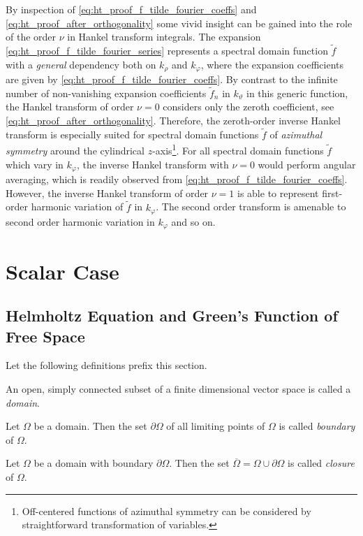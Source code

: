 By inspection of \eqref{eq:ht_proof_f_tilde_fourier_coeffs} and
\eqref{eq:ht_proof_after_orthogonality} some vivid insight can be gained
into the role of the order $\nu$ in Hankel transform integrals. 
The expansion \eqref{eq:ht_proof_f_tilde_fourier_series} represents a
spectral domain function $\tilde{f}$ with a \emph{general} dependency both on
$k_\rho$ and $k_\varphi$, where the expansion coefficients are given by
\eqref{eq:ht_proof_f_tilde_fourier_coeffs}.
By contrast to the infinite number of non-vanishing expansion coefficients
$\tilde{f}_n$ in $k_\vartheta$ in this generic function, the Hankel transform
of order $\nu = 0$ considers only the zeroth coefficient,
see \eqref{eq:ht_proof_after_orthogonality}.
Therefore, the zeroth-order inverse Hankel transform is especially suited for
spectral domain functions $\tilde{f}$ of \emph{azimuthal symmetry} around the
cylindrical $z$-axis\footnote{Off-centered functions of azimuthal
symmetry can be considered by straightforward transformation of variables.}.
For all spectral domain functions $\tilde{f}$ which vary in $k_\varphi$, the
inverse Hankel transform with $\nu = 0$ would perform angular averaging, which
is readily observed from \eqref{eq:ht_proof_f_tilde_fourier_coeffs}.
However, the inverse Hankel transform of order $\nu = 1$ is able to represent
first-order harmonic variation of $\tilde{f}$ in $k_\varphi$.
The second order transform is amenable to second order harmonic variation in
$k_\varphi$ and so on.








\chapter{Scalar Case}
\label{ch:scalar_case}







\section{Helmholtz Equation and Green's Function of Free Space}
\label{sec:helmholtz_eq_and_gf}

Let the following definitions prefix this section.
\begin{definition}[Domain]
	An open, simply connected subset of a finite dimensional vector space is
	called a \emph{domain}.
\end{definition}
\begin{definition}[Boundary]
	Let $\Omega$ be a domain.
	Then the set $\partial\Omega$ of all limiting points of $\Omega$ is called
	\emph{boundary} of $\Omega$.
\end{definition}
\begin{definition}[Closure]
	Let $\Omega$ be a domain with boundary $\partial\Omega$.
	Then the set $\overline{\Omega} = \Omega \cup \partial\Omega$
	is called \emph{closure} of $\Omega$.
\end{definition}

